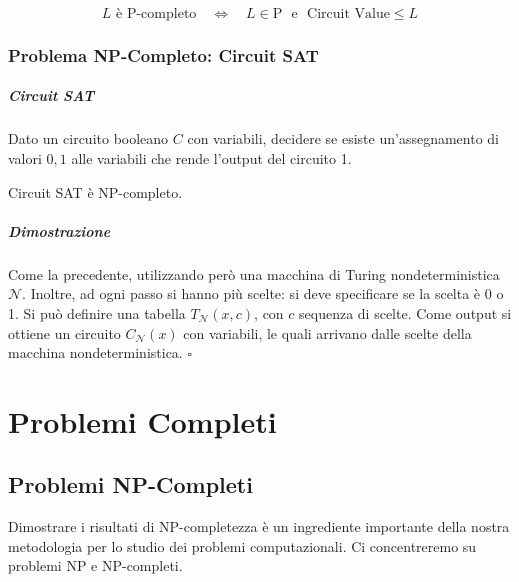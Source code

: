 \begin{corollary}
    $$
        L \text{ è P-completo} \quad \Leftrightarrow \quad L \in\text{P ~e~ Circuit Value} \leq L
    $$
\end{corollary}


\subsection{Problema NP-Completo: Circuit SAT}
\paragraph{Circuit SAT} Dato un circuito booleano $C$ con variabili, decidere se esiste un'assegnamento di valori $0,1$ alle variabili che rende l'output del circuito 1.

\begin{theorem}
    Circuit SAT è NP-completo.
\end{theorem}

\paragraph{Dimostrazione} Come la precedente, utilizzando però una macchina di Turing nondeterministica $\mathcal{N}$. Inoltre, ad ogni passo si hanno più scelte: si deve specificare se la scelta è 0 o 1. Si può definire una tabella $T_\mathcal{N}(x,c)$, con $c$ sequenza di scelte. Come output si ottiene un circuito $C_\mathcal{N}(x)$ con variabili, le quali arrivano dalle scelte della macchina nondeterministica. \hfill$\square$



\chapter{Problemi Completi}


\section{Problemi NP-Completi}
Dimostrare i risultati di NP-completezza è un ingrediente importante della nostra metodologia per lo studio dei problemi computazionali. Ci concentreremo su problemi NP e NP-completi. 

